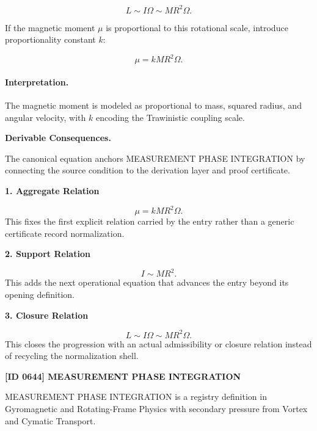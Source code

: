 \begin{equation}
L
\sim
I\Omega
\sim
MR^2\Omega .
\end{equation}

If the magnetic moment $\mu$ is proportional to this rotational scale, introduce proportionality constant $k$:

\begin{equation}
\boxed{
\mu
=
kMR^2\Omega .
}
\end{equation}

\paragraph{Interpretation.}
The magnetic moment is modeled as proportional to mass, squared radius, and angular velocity, with $k$ encoding the Trawinistic coupling scale.

\par\vspace{0.35em}
\noindent\textbf{Derivable Consequences.}\quad
\begingroup
\footnotesize
\raggedright
The canonical equation anchors MEASUREMENT PHASE INTEGRATION by connecting the source condition to the derivation layer and proof certificate.
\par\endgroup

\noindent\textbf{1. Aggregate Relation}\par
\[
\mu = kMR^2\Omega.
\]
\noindent This fixes the first explicit relation carried by the entry rather than a generic certificate record normalization.\par
\noindent\textbf{2. Support Relation}\par
\[
I \sim MR^2.
\]
\noindent This adds the next operational equation that advances the entry beyond its opening definition.\par
\noindent\textbf{3. Closure Relation}\par
\[
L \sim I\Omega \sim MR^2\Omega.
\]
\noindent This closes the progression with an actual admissibility or closure relation instead of recycling the normalization shell.\par

\clearpage
\noindent\textbf{[ID 0644] MEASUREMENT PHASE INTEGRATION}\par
\vspace{0.35em}
\begingroup\small
{}
MEASUREMENT PHASE INTEGRATION is a registry definition in Gyromagnetic and Rotating-Frame Physics with secondary pressure from Vortex and Cymatic Transport.

